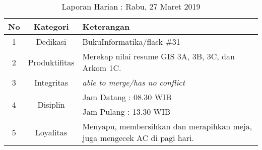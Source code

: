 \begin{table}[htp]
\begin{center}
\caption{Laporan Harian : Rabu, 27 Maret 2019}
\label{tab:lh270319}
\begin{tabularx}{\textwidth}{|l|l|X|}
\hline
\multicolumn{1}{|c|}{\textbf{No}} & \multicolumn{1}{c|}{\textbf{Kategori}} & \textbf{Keterangan} \\ \hline
\multicolumn{1}{|c|}{\multirow{1}{*}{1}} & \multicolumn{1}{c|}{\multirow{1}{*}{\parbox{2.5cm}{Dedikasi}}}
& BukuInformatika/flask \#31\\
\hline
\multicolumn{1}{|c|}{\multirow{1}{*}{2}} & \multicolumn{1}{c|}{\multirow{1}{*}{\parbox{2.5cm}{Produktifitas}}}
& Merekap nilai resume GIS 3A, 3B, 3C, dan Arkom 1C.\\
\hline
\multicolumn{1}{|c|}{\multirow{1}{*}{3}} & \multicolumn{1}{c|}{\multirow{1}{*}{\parbox{2.5cm}{Integritas}}}
& \textit{able to merge/has no conflict} \\
\hline
\multicolumn{1}{|c|}{\multirow{2}{*}{4}} & \multicolumn{1}{c|}{\multirow{2}{*}{\parbox{2.5cm}{Disiplin}}}
& Jam Datang : 08.30 WIB \\
\multicolumn{1}{|c|}{\multirow{1}{*}{}} & \multicolumn{1}{c|}{\multirow{1}{*}{\parbox{2.5cm}{}}}
& Jam Pulang : 13.30 WIB \\
\hline
\multicolumn{1}{|c|}{\multirow{2}{*}{5}} & \multicolumn{1}{c|}{\multirow{2}{*}{\parbox{2.5cm}{Loyalitas}}}
& Menyapu, membersihkan dan merapihkan meja, juga mengecek AC di pagi hari.\\
\hline
\end{tabularx}
\end{center}
\end{table}

